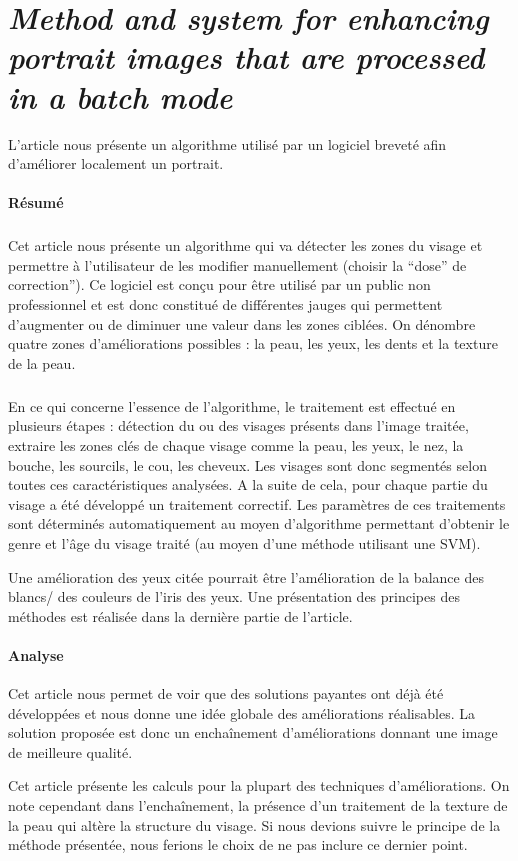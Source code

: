 \documentclass[11pt, french]{report-rd-info}
\begin{document}
\section{\emph{Method and system for enhancing portrait images that are processed in a batch mode}}
L'article \cite{Matraszek2004} nous présente un algorithme utilisé par un logiciel breveté afin d'améliorer localement un portrait.

\paragraph{Résumé}
\subparagraph{}
Cet article nous présente un algorithme qui va détecter les zones du visage et permettre à l'utilisateur de les modifier manuellement (choisir la “dose” de correction”). Ce logiciel est conçu pour être utilisé par un public non professionnel et est donc constitué de différentes jauges qui permettent d'augmenter ou de diminuer une valeur dans les zones ciblées. On dénombre quatre zones d'améliorations possibles : la peau, les yeux, les dents et la texture de la peau.
\subparagraph{}
En ce qui concerne l’essence de l’algorithme, le traitement est effectué en plusieurs étapes : détection du ou des visages présents dans l’image traitée, extraire les zones clés de chaque visage comme la peau, les yeux, le nez, la bouche, les sourcils, le cou, les cheveux. Les visages sont donc segmentés selon toutes ces caractéristiques analysées. A la suite de cela, pour chaque partie du visage a été développé un traitement correctif. Les paramètres de ces traitements sont déterminés automatiquement au moyen d’algorithme permettant d’obtenir le genre et l’âge du visage traité (au moyen d’une méthode utilisant une SVM).

Une amélioration des yeux citée pourrait être l’amélioration de la balance des blancs/ des couleurs de l’iris des yeux. Une présentation des principes des méthodes est réalisée dans la dernière partie de l’article.

\paragraph{Analyse}
Cet article nous permet de voir que des solutions payantes ont déjà été développées et nous donne une idée globale des améliorations réalisables. La solution proposée est donc un enchaînement d’améliorations donnant une image de meilleure qualité. 

Cet article présente les calculs pour la plupart des techniques d’améliorations. On note cependant dans l'enchaînement, la présence d’un traitement de la texture de la peau qui altère la structure du visage. Si nous devions suivre le principe de la méthode présentée, nous ferions le choix de ne pas inclure ce dernier point.
\end{document}
